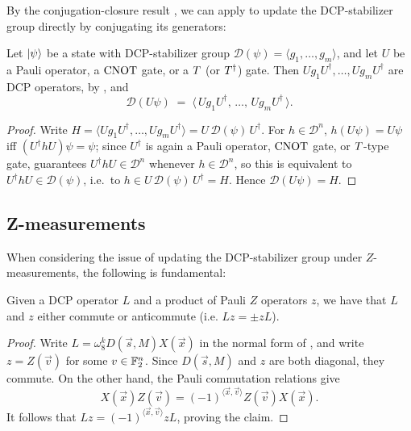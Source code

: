 By the conjugation-closure result , we can apply  to update the DCP-stabilizer group directly by conjugating its generators:

\begin{proposition}\label{prop:dcp-update}
    Let $|\psi\rangle$ be a state with DCP-stabilizer group $\mathcal{D}(\psi) = \langle g_1, \dots, g_m \rangle$, and let $U$ be a Pauli operator, a $\operatorname{CNOT}$ gate, or a $T$ (or $T^\dagger$) gate. Then $Ug_1U^\dagger, \dots, Ug_mU^\dagger$ are DCP operators, by , and
    \[
        \mathcal{D}(U\psi) \;=\; \big\langle\, Ug_1U^\dagger,\, \dots,\, Ug_mU^\dagger \,\big\rangle.
    \]
\end{proposition}
\begin{proof}
    Write $H = \langle Ug_1U^\dagger, \dots, Ug_mU^\dagger\rangle = U\,\mathcal{D}(\psi)\,U^\dagger$. For $h \in \mathcal{D}^n$, $h(U\psi) = U\psi$ iff $(U^\dagger h U)\psi = \psi$; since $U^\dagger$ is again a Pauli operator, $\operatorname{CNOT}$ gate, or $T$-type gate,  guarantees $U^\dagger h U \in \mathcal{D}^n$ whenever $h \in \mathcal{D}^n$, so this is equivalent to $U^\dagger h U \in \mathcal{D}(\psi)$, i.e.\ to $h \in U\,\mathcal{D}(\psi)\,U^\dagger = H$. Hence $\mathcal{D}(U\psi) = H$.
\end{proof}

\subsection{Z-measurements}

When considering the issue of updating the DCP-stabilizer group under $Z$-measurements, the following is fundamental:
\begin{lemma}\label{lem:z-commute}
    Given a DCP operator $L$ and a product of Pauli $Z$ operators $z$, we have that $L$ and $z$ either commute or anticommute (i.e. $L z = \pm z L$).
\end{lemma}
\begin{proof}
    Write $L=\omega_8^kD(\vec{s},M)X(\vec{x})$ in the normal form of
    , and write $z=Z(\vec{v})$ for some
    $v\in\mathbb{F}_2^n$.  Since $D(\vec{s},M)$ and $z$ are both diagonal,
    they commute.  On the other hand, the Pauli commutation relations give
    \[
        X(\vec{x})Z(\vec{v})
        =(-1)^{\langle\vec{x},\vec{v}\rangle}
          Z(\vec{v})X(\vec{x}).
    \]
    It follows that
    $Lz=(-1)^{\langle\vec{x},\vec{v}\rangle}zL$, proving the claim.
\end{proof}

